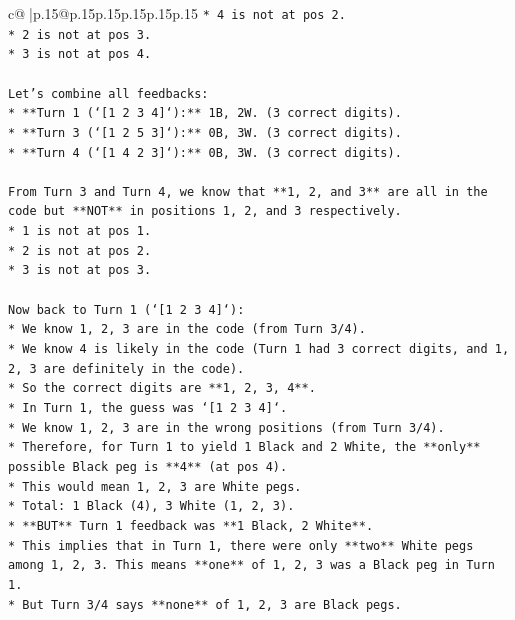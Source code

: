 \documentclass{article}
\begin{document}
{\begin{supertabular}{c@{$\;$}|p{.15\linewidth}@{}p{.15\linewidth}p{.15\linewidth}p{.15\linewidth}p{.15\linewidth}p{.15\linewidth}}
{{{\texttt{*   4 is not at pos 2.} \\
\texttt{*   2 is not at pos 3.} \\
\texttt{*   3 is not at pos 4.} \\
\\ 
\texttt{Let's combine all feedbacks:} \\
\texttt{*   **Turn 1 (`{[}1 2 3 4{]}`):** 1B, 2W. (3 correct digits).} \\
\texttt{*   **Turn 3 (`{[}1 2 5 3{]}`):** 0B, 3W. (3 correct digits).} \\
\texttt{*   **Turn 4 (`{[}1 4 2 3{]}`):** 0B, 3W. (3 correct digits).} \\
\\ 
\texttt{From Turn 3 and Turn 4, we know that **1, 2, and 3** are all in the code but **NOT** in positions 1, 2, and 3 respectively.} \\
\texttt{*   1 is not at pos 1.} \\
\texttt{*   2 is not at pos 2.} \\
\texttt{*   3 is not at pos 3.} \\
\\ 
\texttt{Now back to Turn 1 (`{[}1 2 3 4{]}`):} \\
\texttt{*   We know 1, 2, 3 are in the code (from Turn 3/4).} \\
\texttt{*   We know 4 is likely in the code (Turn 1 had 3 correct digits, and 1, 2, 3 are definitely in the code).} \\
\texttt{*   So the correct digits are **1, 2, 3, 4**.} \\
\texttt{*   In Turn 1, the guess was `{[}1 2 3 4{]}`.} \\
\texttt{*   We know 1, 2, 3 are in the wrong positions (from Turn 3/4).} \\
\texttt{*   Therefore, for Turn 1 to yield 1 Black and 2 White, the **only** possible Black peg is **4** (at pos 4).} \\
\texttt{*   This would mean 1, 2, 3 are White pegs.} \\
\texttt{*   Total: 1 Black (4), 3 White (1, 2, 3).} \\
\texttt{*   **BUT** Turn 1 feedback was **1 Black, 2 White**.} \\
\texttt{*   This implies that in Turn 1, there were only **two** White pegs among 1, 2, 3. This means **one** of 1, 2, 3 was a Black peg in Turn 1.} \\
\texttt{*   But Turn 3/4 says **none** of 1, 2, 3 are Black pegs.} \\
}}}
\end{supertabular}}
\end{document}
